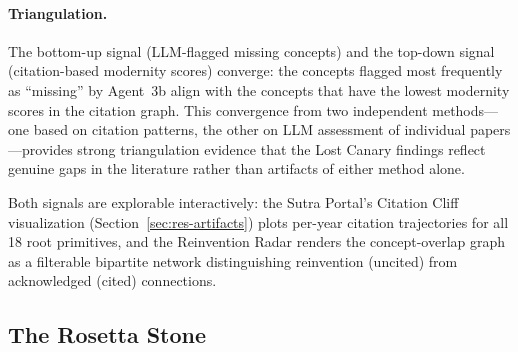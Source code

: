 \documentclass{article}
\begin{document}



\paragraph{Triangulation.}
The bottom-up signal (LLM-flagged missing concepts) and the top-down signal
(citation-based modernity scores) converge: the concepts flagged most frequently as
``missing'' by Agent~3b align with the concepts that have the lowest modernity scores
in the citation graph. This convergence from two independent methods---one based on
citation patterns, the other on LLM assessment of individual papers---provides strong
triangulation evidence that the Lost Canary findings reflect genuine gaps in the
literature rather than artifacts of either method alone.


\noindent
Both signals are explorable interactively: the Sutra Portal's Citation Cliff
visualization (Section~\ref{sec:res-artifacts}) plots per-year citation trajectories
for all 18 root primitives, and the Reinvention Radar renders the concept-overlap
graph as a filterable bipartite network distinguishing reinvention (uncited) from
acknowledged (cited) connections.

\subsection{The Rosetta Stone}
\label{sec:res-rosetta}
\end{document}
